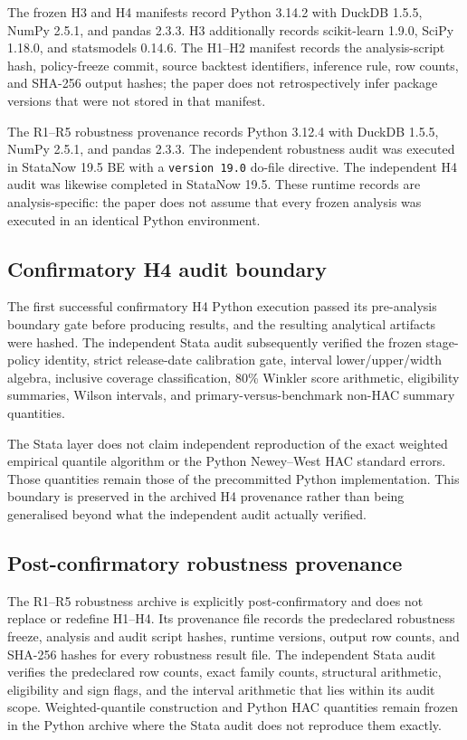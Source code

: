 The frozen H3 and H4 manifests record Python 3.14.2 with DuckDB 1.5.5,
NumPy 2.5.1, and pandas 2.3.3. H3 additionally records
scikit-learn 1.9.0, SciPy 1.18.0, and statsmodels 0.14.6. The H1--H2
manifest records the analysis-script hash, policy-freeze commit, source
backtest identifiers, inference rule, row counts, and SHA-256 output hashes;
the paper does not retrospectively infer package versions that were not stored
in that manifest.

The R1--R5 robustness provenance records Python 3.12.4 with DuckDB 1.5.5,
NumPy 2.5.1, and pandas 2.3.3. The independent robustness audit was executed
in StataNow 19.5 BE with a \texttt{version 19.0} do-file directive. The
independent H4 audit was likewise completed in StataNow 19.5. These runtime
records are analysis-specific: the paper does not assume that every frozen
analysis was executed in an identical Python environment.

\subsection{Confirmatory H4 audit boundary}

The first successful confirmatory H4 Python execution passed its pre-analysis
boundary gate before producing results, and the resulting analytical artifacts
were hashed. The independent Stata audit subsequently verified the frozen
stage-policy identity, strict release-date calibration gate, interval
lower/upper/width algebra, inclusive coverage classification, 80\% Winkler
score arithmetic, eligibility summaries, Wilson intervals, and
primary-versus-benchmark non-HAC summary quantities.

The Stata layer does not claim independent reproduction of the exact weighted
empirical quantile algorithm or the Python Newey--West HAC standard errors.
Those quantities remain those of the precommitted Python implementation. This
boundary is preserved in the archived H4 provenance rather than being
generalised beyond what the independent audit actually verified.

\subsection{Post-confirmatory robustness provenance}

The R1--R5 robustness archive is explicitly post-confirmatory and does not
replace or redefine H1--H4. Its provenance file records the predeclared
robustness freeze, analysis and audit script hashes, runtime versions, output
row counts, and SHA-256 hashes for every robustness result file. The
independent Stata audit verifies the predeclared row counts, exact family
counts, structural arithmetic, eligibility and sign flags, and the interval
arithmetic that lies within its audit scope. Weighted-quantile construction
and Python HAC quantities remain frozen in the Python archive where the Stata
audit does not reproduce them exactly.